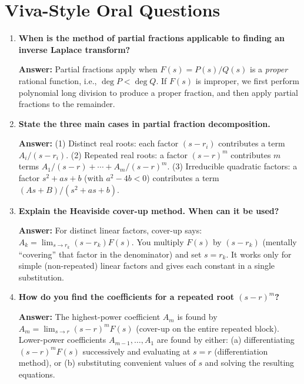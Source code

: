 \documentclass[12pt,a4paper]{article}
\begin{document}
\section{Viva-Style Oral Questions}

\begin{enumerate}[label=\textbf{Q\arabic*.}, leftmargin=*, itemsep=1em]

\item \textbf{When is the method of partial fractions applicable to finding
  an inverse Laplace transform?}

  \textbf{Answer:} Partial fractions apply when $F(s) = P(s)/Q(s)$ is a
  \emph{proper} rational function, i.e., $\deg P < \deg Q$. If $F(s)$ is
  improper, we first perform polynomial long division to produce a proper
  fraction, and then apply partial fractions to the remainder.

\item \textbf{State the three main cases in partial fraction decomposition.}

  \textbf{Answer:} (1) Distinct real roots: each factor $(s-r_i)$ contributes
  a term $A_i/(s-r_i)$. (2) Repeated real roots: a factor $(s-r)^m$ contributes
  $m$ terms $A_1/(s-r)+\cdots+A_m/(s-r)^m$. (3) Irreducible quadratic factors:
  a factor $s^2+as+b$ (with $a^2-4b<0$) contributes a term $(As+B)/(s^2+as+b)$.

\item \textbf{Explain the Heaviside cover-up method. When can it be used?}

  \textbf{Answer:} For distinct linear factors, cover-up says:
  $A_k = \lim_{s\to r_k}(s-r_k)F(s)$. You multiply $F(s)$ by $(s-r_k)$
  (mentally ``covering'' that factor in the denominator) and set $s=r_k$.
  It works only for simple (non-repeated) linear factors and gives each
  constant in a single substitution.

\item \textbf{How do you find the coefficients for a repeated root $(s-r)^m$?}

  \textbf{Answer:} The highest-power coefficient $A_m$ is found by
  $A_m=\lim_{s\to r}(s-r)^m F(s)$ (cover-up on the entire repeated block).
  Lower-power coefficients $A_{m-1}, \ldots, A_1$ are found by
  either: (a) differentiating $(s-r)^m F(s)$ successively and evaluating
  at $s=r$ (differentiation method), or (b) substituting convenient values
  of $s$ and solving the resulting equations.


\end{enumerate}
\end{document}
